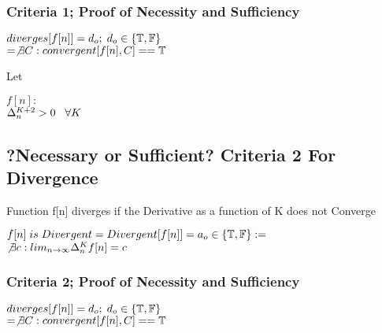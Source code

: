 \documentclass[11pt]{article}
\begin{document}
\subsubsection{Criteria 1; Proof of Necessity and Sufficiency}
\begin{center}
$
diverges \lbrack f \lbrack n \rbrack \rbrack = d_o; \hspace{1mm} d_o \in \{\mathbb{T},\mathbb{F}\}
$
\\ \vspace{4mm}
$
= \not \exists C : convergent[f[n],C] == \mathbb{T}
$
\end{center}
Let
\begin{center}
$
f[n] :
$
\\ \vspace{2mm}
$
\Delta_{n}^{K+2} > 0 \hspace{3mm} \forall K
$
\end{center}




\subsection{?Necessary or Sufficient? Criteria 2 For Divergence}
Function f[n] diverges if the Derivative as a function of K does not Converge
\begin{center}
\vspace{2mm}
$
f[n]\hspace{1mm} is \hspace{1mm} Divergent = Divergent[f[n]] = a_o \in \{\mathbb{T},\mathbb{F}\} :=
$
\\ \vspace{4mm}
$
\not \exists c: lim_{n\rightarrow \infty} \Delta_n^K f[n] = c
$
\end{center}








\subsubsection{Criteria 2; Proof of Necessity and Sufficiency}
\begin{center}
$
diverges \lbrack f \lbrack n \rbrack \rbrack = d_o; \hspace{1mm} d_o \in \{\mathbb{T},\mathbb{F}\}
$
\\ \vspace{4mm}
$
= \not \exists C : convergent[f[n],C] == \mathbb{T}
$
\end{center}
\end{document}
